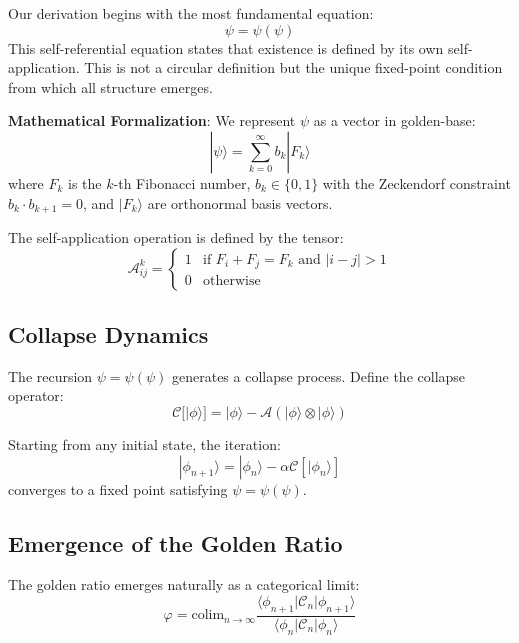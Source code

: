 \documentclass[%
 reprint,
 amsmath,amssymb,
 aps,
 prd,
 10pt,
 nofootinbib,      %
 longbibliography  %
]{revtex4-2}
\theoremstyle{definition}
\theoremstyle{remark}
\begin{document}
Our derivation begins with the most fundamental equation:
\begin{equation}
\psi = \psi(\psi)
\label{eq:primordial}
\end{equation}
This self-referential equation states that existence is defined by its own self-application. 
This is not a circular definition but the unique fixed-point condition from which all structure emerges.

\textbf{Mathematical Formalization}: We represent $\psi$ as a vector in golden-base:
\begin{equation}
|\psi\rangle = \sum_{k=0}^{\infty} b_k |F_k\rangle
\end{equation}
where $F_k$ is the $k$-th Fibonacci number, $b_k \in \{0, 1\}$ with the Zeckendorf constraint $b_k \cdot b_{k+1} = 0$, and $|F_k\rangle$ are orthonormal basis vectors.

The self-application operation is defined by the tensor:
\begin{equation}
\mathcal{A}_{ij}^k = \begin{cases}
1 & \text{if } F_i + F_j = F_k \text{ and } |i-j| > 1 \\
0 & \text{otherwise}
\end{cases}
\end{equation}

\subsection{Collapse Dynamics}

The recursion $\psi = \psi(\psi)$ generates a collapse process. Define the collapse operator:
\begin{equation}
\mathcal{C}[|\phi\rangle] = |\phi\rangle - \mathcal{A}(|\phi\rangle \otimes |\phi\rangle)
\end{equation}

Starting from any initial state, the iteration:
\begin{equation}
|\phi_{n+1}\rangle = |\phi_n\rangle - \alpha \mathcal{C}[|\phi_n\rangle]
\end{equation}
converges to a fixed point satisfying $\psi = \psi(\psi)$.

\subsection{Emergence of the Golden Ratio}

The golden ratio emerges naturally as a categorical limit:
\begin{equation}
\varphi = \text{colim}_{n \to \infty} \frac{\langle\phi_{n+1}|\mathcal{C}_n|\phi_{n+1}\rangle}{\langle\phi_n|\mathcal{C}_n|\phi_n\rangle}
\end{equation}
\end{document}
